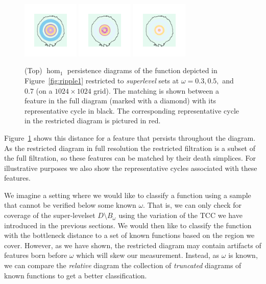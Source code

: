\begin{figure}[htbp]
  \includegraphics[trim=500 500 500 500, clip, width=0.24\textwidth]{scripts/figures/matching2/surf_top-1_0.png}
  \includegraphics[trim=500 500 500 500, clip, width=0.24\textwidth]{scripts/figures/matching2/surf_top-1_1.png}
  \includegraphics[trim=500 500 500 500, clip, width=0.24\textwidth]{scripts/figures/matching2/surf_top-1_2.png}
  \caption{(Top) $\hom_1$ persistence diagrams of the function depicted in Figure~\ref{fig:ripple1} restricted to \emph{superlevel} sets at $\omega = 0.3, 0.5,$ and $0.7$ (on a $1024\times 1024$ grid).
  The matching is shown between a feature in the full diagram (marked with a diamond) with its representative cycle in black.
  The corresponding representative cycle in the restricted diagram is pictured in red.}\label{fig:restricted}
\end{figure}

Figure~\ref{fig:restricted} shows this distance for a feature that persists throughout the diagram.
As the restricted diagram in full resolution the restricted filtration is a subset of the full filtration, so these features can be matched by their death simplices.
For illustrative purposes we also show the representative cycles associated with these features.

We imagine a setting where we would like to classify a function using a sample that cannot be verified below some known $\omega$.
That is, we can only check for coverage of the super-levelset $D\setminus B_\omega$ using the variation of the TCC we have introduced in the previous sections.
We would then like to classify the function with the bottleneck distance to a set of known functions based on the region we cover.
However, as we have shown, the restricted diagram may contain artifacts of features born before $\omega$ which will skew our measurement.
Instead, as $\omega$ is known, we can compare the \emph{relative} diagram the collection of \emph{truncated} diagrams of known functions to get a better classification.


